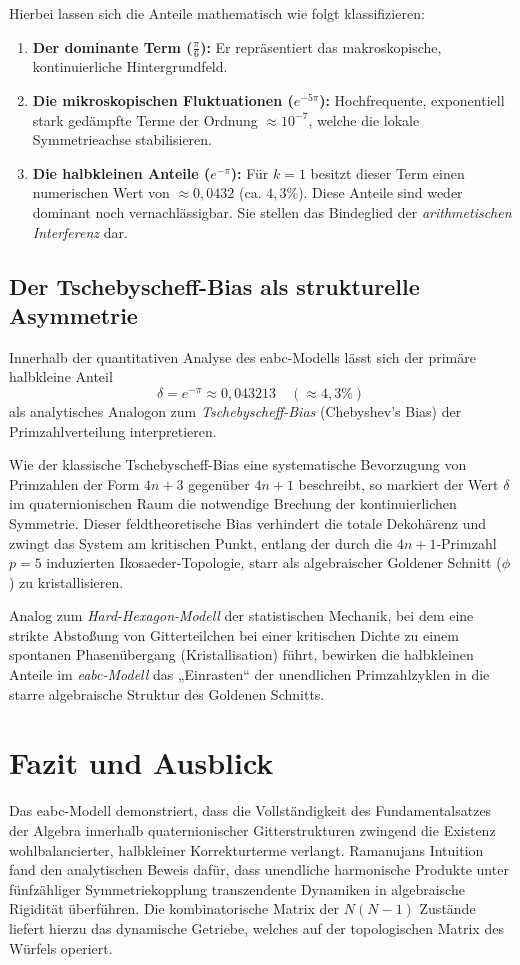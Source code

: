 \documentclass[11pt,a4paper]{article}
\begin{document}
	Hierbei lassen sich die Anteile mathematisch wie folgt klassifizieren:
	\begin{enumerate}
		\item \textbf{Der dominante Term ($\frac{\pi}{6}$):} Er repräsentiert das makroskopische, kontinuierliche Hintergrundfeld.
		\item \textbf{Die mikroskopischen Fluktuationen ($e^{-5\pi}$):} Hochfrequente, exponentiell stark gedämpfte Terme der Ordnung $\approx 10^{-7}$, welche die lokale Symmetrieachse stabilisieren.
		\item \textbf{Die halbkleinen Anteile ($e^{-\pi}$):} Für $k=1$ besitzt dieser Term einen numerischen Wert von $\approx 0{,}0432$ (ca. $4{,}3\%$). Diese Anteile sind weder dominant noch vernachlässigbar. Sie stellen das Bindeglied der \textit{arithmetischen Interferenz} dar.
	\end{enumerate}
	\subsection{Der Tschebyscheff-Bias als strukturelle Asymmetrie}
	Innerhalb der quantitativen Analyse des eabc-Modells lässt sich der primäre halbkleine Anteil 
	\begin{equation}
		\delta = e^{-\pi} \approx 0{,}043213 \quad (\approx 4{,}3\%)
	\end{equation}
	als analytisches Analogon zum \textit{Tschebyscheff-Bias} (Chebyshev's Bias) der Primzahlverteilung interpretieren. 
	
	Wie der klassische Tschebyscheff-Bias eine systematische Bevorzugung von Primzahlen der Form $4n+3$ gegenüber $4n+1$ beschreibt, so markiert der Wert $\delta$ im quaternionischen Raum die notwendige Brechung der kontinuierlichen Symmetrie. Dieser feldtheoretische Bias verhindert die totale Dekohärenz und zwingt das System am kritischen Punkt, entlang der durch die $4n+1$-Primzahl $p=5$ induzierten Ikosaeder-Topologie, starr als algebraischer Goldener Schnitt ($\phi$) zu kristallisieren.
	
	Analog zum \textit{Hard-Hexagon-Modell} der statistischen Mechanik, bei dem eine strikte Abstoßung von Gitterteilchen bei einer kritischen Dichte zu einem spontanen Phasenübergang (Kristallisation) führt, bewirken die halbkleinen Anteile im \textit{eabc-Modell} das „Einrasten“ der unendlichen Primzahlzyklen in die starre algebraische Struktur des Goldenen Schnitts.
	
	\section{Fazit und Ausblick}
	Das eabc-Modell demonstriert, dass die Vollständigkeit des Fundamentalsatzes der Algebra innerhalb quaternionischer Gitterstrukturen zwingend die Existenz wohlbalancierter, halbkleiner Korrekturterme verlangt. Ramanujans Intuition fand den analytischen Beweis dafür, dass unendliche harmonische Produkte unter fünfzähliger Symmetriekopplung transzendente Dynamiken in algebraische Rigidität überführen. Die kombinatorische Matrix der $N(N-1)$ Zustände liefert hierzu das dynamische Getriebe, welches auf der topologischen Matrix des Würfels operiert.
	
\end{document}
